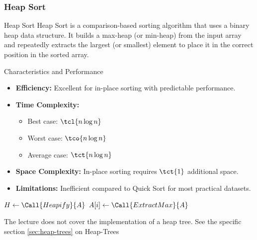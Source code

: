 \newpage
\subsubsection{Heap Sort}
\begin{definition}[]{Heap Sort}
    Heap Sort is a comparison-based sorting algorithm that uses a binary heap data structure. It builds a max-heap (or min-heap) from the input array and repeatedly extracts the largest (or smallest) element to place it in the correct position in the sorted array.
\end{definition}

\begin{properties}[]{Characteristics and Performance}
    \begin{itemize}
        \item \textbf{Efficiency:} Excellent for in-place sorting with predictable performance.
        \item \textbf{Time Complexity:}
              \begin{itemize}
                  \item Best case: $\tcl{n \log n}$
                  \item Worst case: $\tco{n \log n}$
                  \item Average case: $\tct{n \log n}$
              \end{itemize}
        \item \textbf{Space Complexity:} In-place sorting requires $\tct{1}$ additional space.
        \item \textbf{Limitations:} Inefficient compared to Quick Sort for most practical datasets.
    \end{itemize}
\end{properties}

\begin{algorithm}
    \begin{spacing}{1.2}
        \caption{Heap Sort}
        \begin{algorithmic}[1]
                \State $H \gets \Call{Heapify}{A}$
                    \State $A[i] \gets \Call{ExtractMax}{A}$
                \EndFor
            \EndProcedure
        \end{algorithmic}
    \end{spacing}
\end{algorithm}

The lecture does not cover the implementation of a heap tree. See the specific section \ref{sec:heap-trees} on Heap-Trees


